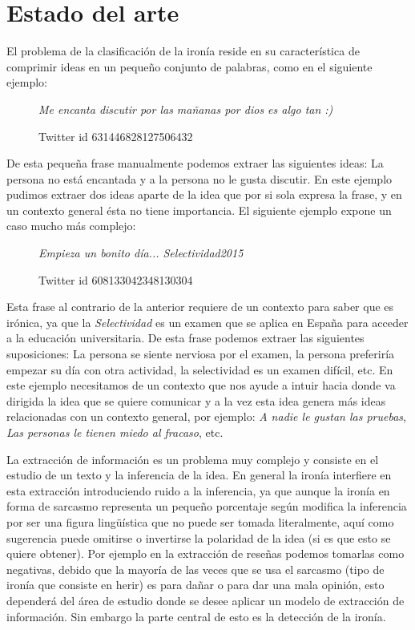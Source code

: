	\section{Estado del arte}
\par El problema de la clasificación de la ironía reside en su característica de comprimir ideas en un pequeño conjunto de palabras, como en el siguiente ejemplo:
    \begin{figure}[ht!]
        
    \begin{center}
        \textit{Me encanta discutir por las mañanas por dios es algo tan :)}
    \end{center}
        \caption{\footnotesize{Twitter id 631446828127506432}}
    \end{figure}
    
    \par De esta pequeña frase manualmente podemos extraer las siguientes ideas: La persona no está encantada y a la persona no le gusta discutir. En este ejemplo pudimos extraer dos ideas aparte de la idea que por si sola expresa la frase, y en un contexto general ésta no tiene importancia. El siguiente ejemplo expone un caso mucho más complejo:
    \begin{figure}[ht!]
    \centering    
    
        \textit{Empieza un bonito día...  Selectividad2015}
        \caption{\footnotesize{Twitter id 608133042348130304}}
    \end{figure}
    
    \par Esta frase al contrario de la anterior requiere de un contexto para saber que es irónica, ya que la \textit{Selectividad} es un examen que se aplica en España para acceder a la educación universitaria. De esta frase podemos extraer las siguientes suposiciones: La persona se siente nerviosa por el examen, la persona preferiría empezar su día con otra actividad, la selectividad es un examen difícil, etc. En este ejemplo necesitamos de un contexto que nos ayude a intuir hacia donde va dirigida la idea que se quiere comunicar y a la vez esta idea genera más ideas relacionadas con un contexto general, por ejemplo: \textit{A nadie le gustan las pruebas}, \textit{Las personas le tienen miedo al fracaso}, etc. 
    
    \par La extracción de información es un problema muy complejo y consiste en el estudio de un texto y la inferencia de la idea. En general la ironía interfiere en esta extracción introduciendo ruido a la inferencia, ya que aunque la ironía en forma de sarcasmo representa un pequeño porcentaje según \cite{liu2007low} modifica la inferencia por ser una figura lingüística que no puede ser tomada literalmente, aquí como sugerencia puede omitirse o invertirse la polaridad de la idea (si es que esto se quiere obtener). Por ejemplo en la extracción de reseñas podemos tomarlas como negativas, debido que la mayoría de las veces que se usa el sarcasmo (tipo de ironía que consiste en herir) es para dañar o para dar una mala opinión, esto dependerá del área de estudio donde se desee aplicar un modelo de extracción de información. Sin embargo la parte central de esto es la detección de la ironía.
    
